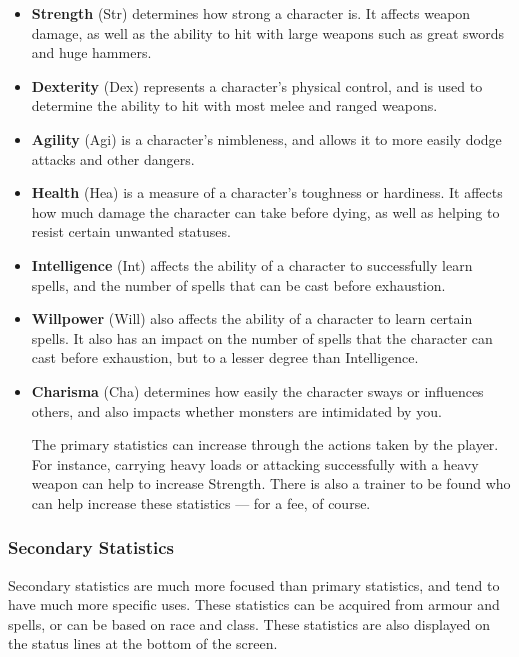 \begin{itemize}
\item {\bf Strength} (Str) determines how strong a character is.  It 
affects weapon damage, as well as the ability to hit with large weapons 
such as great swords and huge hammers.

\item {\bf Dexterity} (Dex) represents a character's physical control, and 
is used to determine the ability to hit with most melee and ranged weapons.

\item {\bf Agility} (Agi) is a character's nimbleness, and allows it to 
more easily dodge attacks and other dangers.

\item {\bf Health} (Hea) is a measure of a character's toughness or 
hardiness.  It affects how much damage the character can take before dying,
as well as helping to resist certain unwanted statuses.

\item {\bf Intelligence} (Int) affects the ability of a character to 
successfully learn spells, and the number of spells that can be cast 
before exhaustion.

\item {\bf Willpower} (Will) also affects the ability of a character to 
learn certain spells.  It also has an impact on the number of spells that 
the character can cast before exhaustion, but to a lesser degree than
Intelligence.

\item {\bf Charisma} (Cha) determines how easily the character sways or
influences others, and also impacts whether monsters are intimidated by 
you.

The primary statistics can increase through the actions taken by the
player.  For instance, carrying heavy loads or attacking successfully with
a heavy weapon can help to increase Strength.  There is also a trainer
to be found who can help increase these statistics --- for a fee, of
course.

\end{itemize}
\subsubsection{Secondary Statistics}

Secondary statistics are much more focused than primary statistics, and
tend to have much more specific uses.  These statistics can be acquired
from armour and spells, or can be based on race and class.  These
statistics are also displayed on the status lines at the bottom of the
screen.

